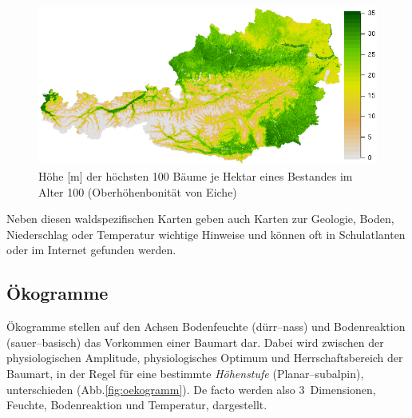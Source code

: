 \documentclass[twocolumn]{scrartcl}
\begin{document}
\begin{figure}[htbp]
  \centering
  \includegraphics[width=.95\columnwidth]{./pic/quSp_t0_p1.png}
  \caption{Höhe [m] der höchsten 100 Bäume je Hektar eines Bestandes im
    Alter 100 (Oberhöhenbonität von Eiche)
    \citep[S.~17]{kindermann2021Eiche}}
  \label{fig:Eichenbonitaet}
\end{figure}

Neben diesen waldspezifischen Karten geben auch Karten zur Geologie,
Boden, Niederschlag oder Temperatur wichtige Hinweise und können oft
in Schulatlanten oder im Internet gefunden werden.


\subsection{Ökogramme}
\label{sec:oekogramme}

Ökogramme stellen auf den Achsen Bodenfeuchte (dürr--nass) und
Bodenreaktion (sauer--basisch) das Vorkommen einer Baumart dar. Dabei
wird zwischen der physiologischen Amplitude, physiologisches Optimum
und Herrschaftsbereich der Baumart, in der Regel für eine bestimmte
\emph{Höhenstufe} (Planar--subalpin), unterschieden
(Abb.\ref{fig:oekogramm}). De facto werden also 3~Dimensionen,
Feuchte, Bodenreaktion und Temperatur, dargestellt.
\end{document}
